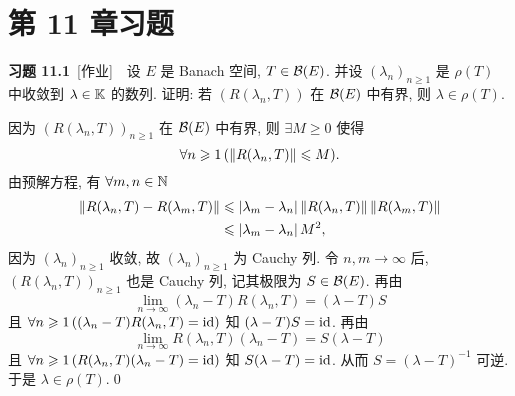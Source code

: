 \section{第 11 章习题}
	\textbf{习题 11.1}\ [作业]\ \ 设 $ E $ 是 Banach 空间, $ T\in\mathcal{B}(E) $. 并设 $ (\lambda_{n})_{n\geqslant1} $ 是 $ \rho(T) $ 中收敛到 $ \lambda\in\mathbb{K} $ 的数列. 证明: 若 $ (R(\lambda_{n}, T)) $ 在 $ \mathcal{B}(E) $ 中有界, 则 $ \lambda\in\rho(T) $.
	\begin{Proof}
		因为 $ (R(\lambda_{n}, T))_{n\geqslant1} $ 在 $ \mathcal{B}(E) $ 中有界, 则 $ \exists M\geqslant0 $ 使得
		\[
			\forall n\geqslant1\,(\left\| R(\lambda_{n}, T) \right\|\leqslant M).
		\]
		由预解方程, 有 $ \forall m, n\in\mathbb{N} $
		\[
			\begin{aligned}
				\left\| R(\lambda_{n}, T)-R(\lambda_{m}, T) \right\| & \leqslant \left| \lambda_{m}-\lambda_{n} \right| \left\| R(\lambda_{n}, T) \right\|\left\| R(\lambda_{m}, T) \right\|\\
				& \leqslant\left| \lambda_{m}-\lambda_{n} \right| M^{2},
			\end{aligned}
		\]
		因为 $ (\lambda_{n})_{n\geqslant1} $ 收敛, 故 $ (\lambda_{n})_{n\geqslant1} $ 为 Cauchy 列. 令 $ n, m\to\infty $ 后, $ (R(\lambda_{n}, T))_{n\geqslant1} $ 也是 Cauchy 列, 记其极限为 $ S\in\mathcal{B}(E) $. 再由
		\[
			\lim_{n\to\infty}(\lambda_{n}-T)R(\lambda_{n}, T)=(\lambda-T)S
		\]
		且 $ \forall n\geqslant1\,((\lambda_{n}-T)R(\lambda_{n}, T)=\mathrm{id}) $ 知 $ (\lambda-T)S=\mathrm{id} $. 再由
		\[
			\lim_{n\to\infty} R(\lambda_{n}, T)(\lambda_{n}-T)=S(\lambda-T)
		\]
		且 $ \forall n\geqslant1\,(R(\lambda_{n}, T)(\lambda_{n}-T)=\mathrm{id}) $ 知 $ S(\lambda-T)=\mathrm{id} $. 从而 $ S=(\lambda-T)^{-1} $ 可逆. 于是 $ \lambda\in\rho(T) $.\qed
	\end{Proof}

